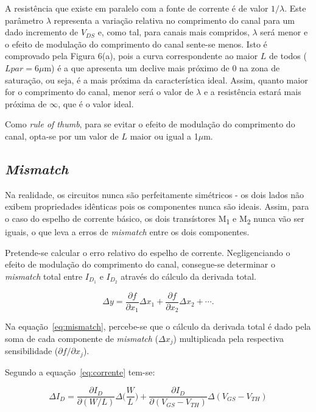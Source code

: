 \documentclass[11pt]{article}
\numberwithin{equation}{section}
\begin{document}
A resistência que existe em paralelo com a fonte de corrente é de valor $1/\lambda$. Este parâmetro $\lambda$ representa a variação relativa no comprimento do canal para um dado incremento de $V_{DS}$ e, como tal, para canais mais compridos, $\lambda$ será menor e o efeito de modulação do comprimento do canal sente-se menos. Isto é comprovado pela Figura 6(a), pois a curva correspondente ao maior $L$ de todos ($Lpar = 6\mu$m) é a que apresenta um declive mais próximo de 0 na zona de saturação, ou seja, é a mais próxima da característica ideal. Assim, quanto maior for o comprimento do canal, menor será o valor de $\lambda$ e a resistência estará mais próxima de $\infty$, que é o valor ideal. 

Como \textit{rule of thumb}, para se evitar o efeito de modulação do comprimento do canal, opta-se por um valor de $L$ maior ou igual a 1$\mu$m.

\subsection{\textit{Mismatch}}

Na realidade, os circuitos nunca são perfeitamente simétricos - os dois lados não exibem propriedades idênticas pois os componentes nunca são ideais. Assim, para o caso do espelho de corrente básico, os dois transístores M\textsubscript{1} e M\textsubscript{2} nunca vão ser iguais, o que leva a erros de \textit{mismatch} entre os dois componentes.

Pretende-se calcular o erro relativo do espelho de corrente. Negligenciando o efeito de modulação do comprimento do canal, consegue-se determinar o \textit{mismatch} total entre $I_{D_{1}}$ e $I_{D_{2}}$ através do cálculo da derivada total.

\vspace{-3mm}
\begin{equation}
\Delta y = \frac{\partial f}{\partial x_{1}}\Delta x_{1} + \frac{\partial f}{\partial x_{2}}\Delta x_{2} + \cdots.
\label{eq:mismatch}
\end{equation}

\vspace{1mm}
Na equação~\ref{eq:mismatch}, percebe-se que o cálculo da derivada total é dado pela soma de cada componente de \textit{mismatch} ($\Delta x_{j}$) multiplicada pela respectiva sensibilidade (${\partial f}/{\partial x_{j}}$).

Segundo a equação~\ref{eq:corrente} tem-se:

\vspace{-3mm}
\begin{equation}
\Delta I_{D} = \frac{\partial I_{D}}{\partial ({W}/{L})}\Delta \Big(\frac{W}{L}\Big) + \frac{\partial I_{D}}{\partial (V_{GS}-V_{TH})}\Delta (V_{GS}-V_{TH})
\end{equation}
\end{document}
